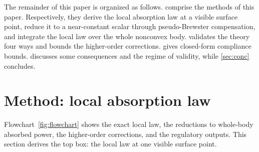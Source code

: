 \documentclass[journal,twocolumn,10pt]{IEEEtran}
\begin{document}
The remainder of this paper is organized as follows.
 comprise the methods of this paper.
Respectively, they derive the local absorption law at a visible
surface point, reduce it to a near-constant scalar through
pseudo-Brewster compensation, and integrate the local law over the
whole nonconvex body.  validates the theory four ways
and bounds the higher-order corrections.  gives
closed-form compliance bounds.  discusses some
consequences and the regime of validity, while \cref{sec:conc}
concludes.

\section{Method: local absorption law}\label{sec:law}

Flowchart~\ref{fig:flowchart} shows the exact local law, the
reductions to whole-body absorbed power, the higher-order
corrections, and the regulatory outputs. This section derives the top
box: the local law at one visible surface point.
\end{document}
